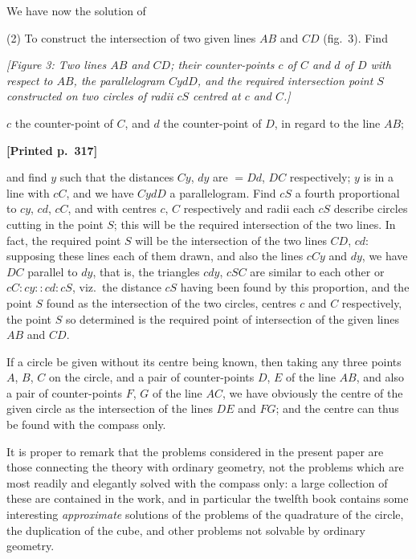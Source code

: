 \documentclass[11pt]{article}
\begin{document}
\medskip

We have now the solution of

\medskip

(2) \quad To construct the intersection of two given lines $AB$ and $CD$ (fig.~3). Find

\medskip

\textit{[Figure 3: Two lines $AB$ and $CD$; their counter-points $c$ of $C$ and $d$ of $D$ with respect to $AB$, the parallelogram $CydD$, and the required intersection point $S$ constructed on two circles of radii $cS$ centred at $c$ and $C$.]}

\medskip

$c$ the counter-point of $C$, and $d$ the counter-point of $D$, in regard to the line $AB$;

\bigskip

\noindent\textbf{[Printed p.~317]}\hfill

and find $y$ such that the distances $Cy$, $dy$ are $= Dd$, $DC$ respectively; $y$ is in a line with $cC$, and we have $CydD$ a parallelogram. Find $cS$ a fourth proportional to $cy$, $cd$, $cC$, and with centres $c$, $C$ respectively and radii each $cS$ describe circles cutting in the point $S$; this will be the required intersection of the two lines. In fact, the required point $S$ will be the intersection of the two lines $CD$, $cd$: supposing these lines each of them drawn, and also the lines $cCy$ and $dy$, we have $DC$ parallel to $dy$, that is, the triangles $cdy$, $cSC$ are similar to each other or $cC : cy :: cd : cS$, viz.\ the distance $cS$ having been found by this proportion, and the point $S$ found as the intersection of the two circles, centres $c$ and $C$ respectively, the point $S$ so determined is the required point of intersection of the given lines $AB$ and $CD$.

\medskip

If a circle be given without its centre being known, then taking any three points $A$, $B$, $C$ on the circle, and a pair of counter-points $D$, $E$ of the line $AB$, and also a pair of counter-points $F$, $G$ of the line $AC$, we have obviously the centre of the given circle as the intersection of the lines $DE$ and $FG$; and the centre can thus be found with the compass only.

\medskip

It is proper to remark that the problems considered in the present paper are those connecting the theory with ordinary geometry, not the problems which are most readily and elegantly solved with the compass only: a large collection of these are contained in the work, and in particular the twelfth book contains some interesting \textit{approximate} solutions of the problems of the quadrature of the circle, the duplication of the cube, and other problems not solvable by ordinary geometry.
\end{document}
